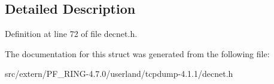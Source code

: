 \subsection{Detailed Description}


Definition at line 72 of file decnet.h.



The documentation for this struct was generated from the following file:\begin{DoxyCompactItemize}
\item 
src/extern/PF\_\-RING-\/4.7.0/userland/tcpdump-\/4.1.1/decnet.h\end{DoxyCompactItemize}
